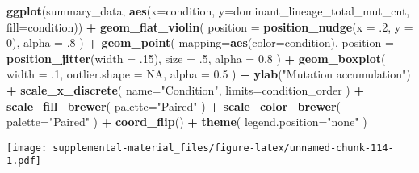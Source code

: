 \documentclass[]{book}
\newenvironment{Shaded}{\begin{snugshade}}{\end{snugshade}}
\newcommand{\DataTypeTok}[1]{\textcolor[rgb]{0.13,0.29,0.53}{#1}}
\newcommand{\DecValTok}[1]{\textcolor[rgb]{0.00,0.00,0.81}{#1}}
\newcommand{\FloatTok}[1]{\textcolor[rgb]{0.00,0.00,0.81}{#1}}
\newcommand{\KeywordTok}[1]{\textcolor[rgb]{0.13,0.29,0.53}{\textbf{#1}}}
\newcommand{\NormalTok}[1]{#1}
\newcommand{\OperatorTok}[1]{\textcolor[rgb]{0.81,0.36,0.00}{\textbf{#1}}}
\newcommand{\OtherTok}[1]{\textcolor[rgb]{0.56,0.35,0.01}{#1}}
\newcommand{\StringTok}[1]{\textcolor[rgb]{0.31,0.60,0.02}{#1}}
\begin{document}
\begin{Shaded}
\begin{Highlighting}[]
\KeywordTok{ggplot}\NormalTok{(summary_data, }\KeywordTok{aes}\NormalTok{(}\DataTypeTok{x=}\NormalTok{condition, }\DataTypeTok{y=}\NormalTok{dominant_lineage_total_mut_cnt, }\DataTypeTok{fill=}\NormalTok{condition)) }\OperatorTok{+}
\StringTok{  }\KeywordTok{geom_flat_violin}\NormalTok{(}
    \DataTypeTok{position =} \KeywordTok{position_nudge}\NormalTok{(}\DataTypeTok{x =} \FloatTok{.2}\NormalTok{, }\DataTypeTok{y =} \DecValTok{0}\NormalTok{),}
    \DataTypeTok{alpha =} \FloatTok{.8}
\NormalTok{  ) }\OperatorTok{+}
\StringTok{  }\KeywordTok{geom_point}\NormalTok{(}
    \DataTypeTok{mapping=}\KeywordTok{aes}\NormalTok{(}\DataTypeTok{color=}\NormalTok{condition),}
    \DataTypeTok{position =} \KeywordTok{position_jitter}\NormalTok{(}\DataTypeTok{width =} \FloatTok{.15}\NormalTok{),}
    \DataTypeTok{size =} \FloatTok{.5}\NormalTok{,}
    \DataTypeTok{alpha =} \FloatTok{0.8}
\NormalTok{  ) }\OperatorTok{+}
\StringTok{  }\KeywordTok{geom_boxplot}\NormalTok{(}
    \DataTypeTok{width =} \FloatTok{.1}\NormalTok{,}
    \DataTypeTok{outlier.shape =} \OtherTok{NA}\NormalTok{,}
    \DataTypeTok{alpha =} \FloatTok{0.5}
\NormalTok{  ) }\OperatorTok{+}
\StringTok{  }\KeywordTok{ylab}\NormalTok{(}\StringTok{"Mutation accumulation"}\NormalTok{) }\OperatorTok{+}
\StringTok{  }\KeywordTok{scale_x_discrete}\NormalTok{(}
    \DataTypeTok{name=}\StringTok{"Condition"}\NormalTok{,}
    \DataTypeTok{limits=}\NormalTok{condition_order}
\NormalTok{  ) }\OperatorTok{+}
\StringTok{  }\KeywordTok{scale_fill_brewer}\NormalTok{(}
    \DataTypeTok{palette=}\StringTok{"Paired"}
\NormalTok{  ) }\OperatorTok{+}
\StringTok{  }\KeywordTok{scale_color_brewer}\NormalTok{(}
    \DataTypeTok{palette=}\StringTok{"Paired"}
\NormalTok{  ) }\OperatorTok{+}
\StringTok{  }\KeywordTok{coord_flip}\NormalTok{() }\OperatorTok{+}
\StringTok{  }\KeywordTok{theme}\NormalTok{(}
    \DataTypeTok{legend.position=}\StringTok{"none"}
\NormalTok{  )}
\end{Highlighting}
\end{Shaded}

\texttt{[image: supplemental-material\_files/figure-latex/unnamed-chunk-114-1.pdf]}

\begin{Shaded}
\end{Shaded}
\end{document}
